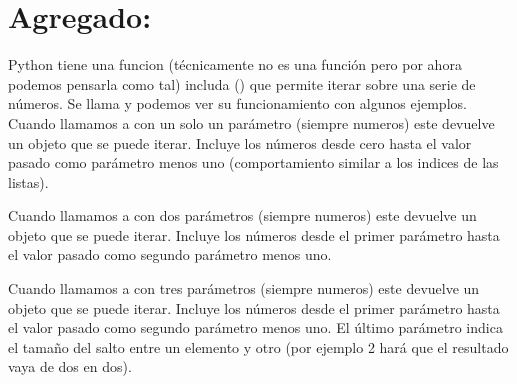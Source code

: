 \documentclass[a5paper,9pt,spanish]{sphinxmanual}
\begin{document}
\section{Agregado: }
\label{\detokenize{for:agregado-range}}
\sphinxAtStartPar
Python tiene una funcion (técnicamente no es una función pero
por ahora podemos pensarla como tal) includa () que
permite iterar sobre una serie de números. Se llama 
y podemos ver su funcionamiento con algunos ejemplos.
Cuando llamamos a  con un solo un parámetro (siempre numeros)
este devuelve un objeto que se puede iterar. Incluye los números
desde cero hasta el valor pasado como parámetro menos uno
(comportamiento similar a los indices de las listas).

\begin{sphinxVerbatim}[commandchars=\\\{\}]
   
\end{sphinxVerbatim}

\sphinxAtStartPar
Cuando llamamos a  con dos parámetros (siempre numeros)
este devuelve un objeto que se puede iterar. Incluye los números
desde el primer parámetro hasta el valor pasado como segundo
parámetro menos uno.

\begin{sphinxVerbatim}[commandchars=\\\{\}]
    
\end{sphinxVerbatim}

\sphinxAtStartPar
Cuando llamamos a  con tres parámetros (siempre numeros)
este devuelve un objeto que se puede iterar. Incluye los números
desde el primer parámetro hasta el valor pasado como segundo
parámetro menos uno. El último parámetro indica el tamaño del
salto entre un elemento y otro (por ejemplo 2 hará que el
resultado vaya de dos en dos).

\begin{sphinxVerbatim}[commandchars=\\\{\}]
     
\end{sphinxVerbatim}
\end{document}
